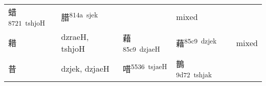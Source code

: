 \documentclass[14pt,a4paper]{scrartcl}
\begin{document}
\begin{longtable}[c]{@{}llllll@{}}
\begin{minipage}[t]{0.14\columnwidth}
蜡\textsuperscript{8721~tshjoH}
\strut\end{minipage} &
\begin{minipage}[t]{0.14\columnwidth}\raggedright\strut
腊\textsuperscript{814a~sjek}
\strut\end{minipage} &
\begin{minipage}[t]{0.14\columnwidth}\raggedright\strut
\strut\end{minipage} &
\begin{minipage}[t]{0.14\columnwidth}\raggedright\strut
mixed
\strut\end{minipage}\tabularnewline
\begin{minipage}[t]{0.14\columnwidth}\raggedright\strut
耤
\strut\end{minipage} &
\begin{minipage}[t]{0.14\columnwidth}\raggedright\strut
dzraeH, tshjoH
\strut\end{minipage} &
\begin{minipage}[t]{0.14\columnwidth}\raggedright\strut
藉\textsuperscript{85c9~dzjaeH}
\strut\end{minipage} &
\begin{minipage}[t]{0.14\columnwidth}\raggedright\strut
藉\textsuperscript{85c9~dzjek}
\strut\end{minipage} &
\begin{minipage}[t]{0.14\columnwidth}\raggedright\strut
\strut\end{minipage} &
\begin{minipage}[t]{0.14\columnwidth}\raggedright\strut
mixed
\strut\end{minipage}\tabularnewline
\begin{minipage}[t]{0.14\columnwidth}\raggedright\strut
昔
\strut\end{minipage} &
\begin{minipage}[t]{0.14\columnwidth}\raggedright\strut
dzjek, dzjaeH
\strut\end{minipage} &
\begin{minipage}[t]{0.14\columnwidth}\raggedright\strut
唶\textsuperscript{5536~tsjaeH}
\strut\end{minipage} &
\begin{minipage}[t]{0.14\columnwidth}\raggedright\strut
鵲\textsuperscript{9d72~tshjak}
\strut\end{minipage} &
\begin{minipage}[t]{0.14\columnwidth}\raggedright\strut
\strut\end{minipage} &
\begin{minipage}[t]{0.14\columnwidth}\raggedright\strut

\end{minipage}
\end{longtable}
\end{document}
